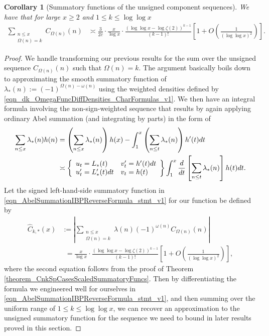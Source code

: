 \documentclass[11pt,reqno,a4letter]{article}
\numberwithin{figure}{section}
\numberwithin{table}{section}
\theoremstyle{plain}
\newtheorem{cor}[theorem]{Corollary}
\numberwithin{theorem}{section}
\theoremstyle{definition}
\begin{document}
\begin{cor}[Summatory functions of the unsigned component sequences] 
\label{cor_SummatoryFuncsOfUnsignedSeqs_v2} 
We have that for large $x \geq 2$ and $1 \leq k \leq \log\log x$ 
\begin{align*} 
\sum_{\substack{n \leq x \\ \Omega(n) = k}} C_{\Omega(n)}(n) & \asymp 
    \frac{3}{2\hat{c}} \cdot \frac{x}{\log x} \cdot 
     \frac{(\log\log x - \log\zeta(2))^{k-1}}{(k-1)!} \left[1 + O\left(\frac{1}{(\log\log x)^2}\right) 
     \right]. 
\end{align*} 
\end{cor} 
\begin{proof} 
We handle transforming our previous results for the sum over the unsigned sequence 
$C_{\Omega(n)}(n)$ such that $\Omega(n) = k$. 
The argument basically boils down to approximating the smooth summatory function of 
$\lambda_{\ast}(n) := (-1)^{\Omega(n) - \omega(n)}$ using the weighted 
densities defined by \eqref{eqn_dk_OmegaFuncDiffDensities_CharFormulas_v1}. 
We then have an integral formula involving the non-sign-weighted 
sequence that results by again 
applying ordinary Abel summation (and integrating by parts) in the form of 
\begin{align} 
\label{eqn_AbelSummationIBPReverseFormula_stmt_v1} 
\sum_{n \leq x} \lambda_{\ast}(n) h(n) & = \left(\sum_{n \leq x} \lambda_{\ast}(n)\right) h(x) - 
     \int_{1}^{x} \left(\sum_{n \leq t} \lambda_{\ast}(n)\right) h^{\prime}(t) dt \\ 
\notag 
     & \asymp \left\{\begin{array}{ll} 
     u_t = L_{\ast}(t) & v_t^{\prime} = h^{\prime}(t) dt \\ 
     u_t^{\prime} = L_{\ast}^{\prime}(t) dt & v_t = h(t) 
     \end{array} 
     \right\} 
     \int_1^{x} \frac{d}{dt}\left[\sum_{n \leq t} \lambda_{\ast}(n)\right] h(t) dt. 
\end{align} 
Let the signed left-hand-side summatory function in 
\eqref{eqn_AbelSummationIBPReverseFormula_stmt_v1} for our function be defined by 
\begin{align*} 
\widehat{C}_{k,\ast}(x) & := \left\lvert \sum_{\substack{n \leq x \\ \Omega(n)=k}} 
     \lambda(n) (-1)^{\omega(n)} C_{\Omega(n)}(n) \right\rvert \\ 
     & \phantom{:} = 
     \frac{x}{\log x} \cdot \frac{(\log\log x - \log\zeta(2))^{k-1}}{(k-1)!} \left[ 
     1 + O\left(\frac{1}{(\log\log x)^2}\right)\right], 
\end{align*} 
where the second equation follows from the proof of 
Theorem \ref{theorem_CnkSpCasesScaledSummatoryFuncs}. 
Then by differentiating the formula we engineered well for ourselves in 
\eqref{eqn_AbelSummationIBPReverseFormula_stmt_v1}, and 
then summing over the uniform range of $1 \leq k \leq \log\log x$, 
we can recover an approximation to the unsigned summatory function for the 
sequence we need to bound in later results proved in this section. 


\end{proof}
\end{document}
